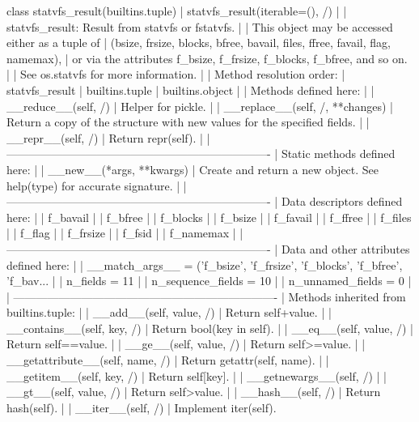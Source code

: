 \documentclass{article}
\begin{document}
    class statvfs_result(builtins.tuple)
     |  statvfs_result(iterable=(), /)
     |
     |  statvfs_result: Result from statvfs or fstatvfs.
     |
     |  This object may be accessed either as a tuple of
     |    (bsize, frsize, blocks, bfree, bavail, files, ffree, favail, flag, namemax),
     |  or via the attributes f_bsize, f_frsize, f_blocks, f_bfree, and so on.
     |
     |  See os.statvfs for more information.
     |
     |  Method resolution order:
     |      statvfs_result
     |      builtins.tuple
     |      builtins.object
     |
     |  Methods defined here:
     |
     |  __reduce__(self, /)
     |      Helper for pickle.
     |
     |  __replace__(self, /, **changes)
     |      Return a copy of the structure with new values for the specified fields.
     |
     |  __repr__(self, /)
     |      Return repr(self).
     |
     |  ----------------------------------------------------------------------
     |  Static methods defined here:
     |
     |  __new__(*args, **kwargs)
     |      Create and return a new object.  See help(type) for accurate signature.
     |
     |  ----------------------------------------------------------------------
     |  Data descriptors defined here:
     |
     |  f_bavail
     |
     |  f_bfree
     |
     |  f_blocks
     |
     |  f_bsize
     |
     |  f_favail
     |
     |  f_ffree
     |
     |  f_files
     |
     |  f_flag
     |
     |  f_frsize
     |
     |  f_fsid
     |
     |  f_namemax
     |
     |  ----------------------------------------------------------------------
     |  Data and other attributes defined here:
     |
     |  __match_args__ = ('f_bsize', 'f_frsize', 'f_blocks', 'f_bfree', 'f_bav...
     |
     |  n_fields = 11
     |
     |  n_sequence_fields = 10
     |
     |  n_unnamed_fields = 0
     |
     |  ----------------------------------------------------------------------
     |  Methods inherited from builtins.tuple:
     |
     |  __add__(self, value, /)
     |      Return self+value.
     |
     |  __contains__(self, key, /)
     |      Return bool(key in self).
     |
     |  __eq__(self, value, /)
     |      Return self==value.
     |
     |  __ge__(self, value, /)
     |      Return self>=value.
     |
     |  __getattribute__(self, name, /)
     |      Return getattr(self, name).
     |
     |  __getitem__(self, key, /)
     |      Return self[key].
     |
     |  __getnewargs__(self, /)
     |
     |  __gt__(self, value, /)
     |      Return self>value.
     |
     |  __hash__(self, /)
     |      Return hash(self).
     |
     |  __iter__(self, /)
     |      Implement iter(self).
\end{document}
